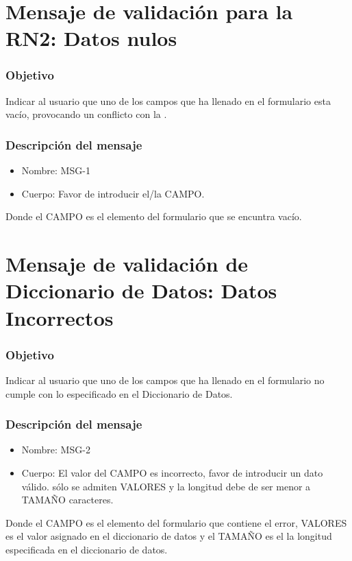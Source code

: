 \section{Mensaje de validación para la RN2: Datos nulos} \label{MSG1}

\subsubsection{Objetivo}
Indicar al usuario que uno de los campos que ha llenado en el formulario esta vacío, provocando un conflicto con la .

\subsubsection{Descripción del mensaje}
\begin{itemize}
\item Nombre: MSG-1
\item Cuerpo: Favor de introducir el/la CAMPO.

\end{itemize}
Donde el CAMPO es el elemento del formulario que se encuntra vacío.


\section{Mensaje de validación de Diccionario de Datos: Datos Incorrectos}\label{MSG2}

\subsubsection{Objetivo}
Indicar al usuario que uno de los campos que ha llenado en el formulario no cumple con lo especificado en el Diccionario de Datos.

\subsubsection{Descripción del mensaje}
\begin{itemize}
\item Nombre: MSG-2
\item Cuerpo: El  valor del CAMPO es incorrecto, favor de introducir un dato válido. sólo se admiten VALORES y la longitud debe de ser menor a TAMAÑO caracteres.

\end{itemize}
Donde el CAMPO es el elemento del formulario que contiene el error, VALORES es el valor asignado en el diccionario de datos y el TAMAÑO es el la longitud especificada en el diccionario de datos.

